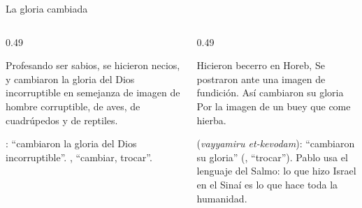 \begin{frame}{La gloria cambiada}
\begin{columns}[t,onlytextwidth]
\begin{column}{0.49\textwidth}
\begin{cita}Profesando ser sabios, se hicieron necios, y cambiaron la gloria del Dios incorruptible en semejanza de imagen de hombre corruptible, de aves, de cuadrúpedos y de reptiles.\end{cita}
\scriptsize{}: ``cambiaron la gloria del Dios incorruptible''. , ``cambiar, trocar''.
\end{column}
\begin{column}{0.49\textwidth}
\begin{cita}Hicieron becerro en Horeb, Se postraron ante una imagen de fundición. Así cambiaron su gloria Por la imagen de un buey que come hierba.\end{cita}
\scriptsize{} (\emph{vayyamiru et-kevodam}): ``cambiaron su gloria'' (, ``trocar''). Pablo usa el lenguaje del Salmo: lo que hizo Israel en el Sinaí es lo que hace toda la humanidad.
\end{column}
\end{columns}
\end{frame}

